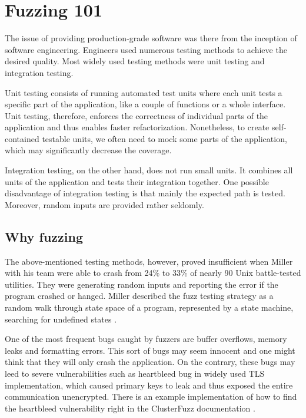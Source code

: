 \chapter{Fuzzing 101}
\label{cha:Introduction to fuzzing}
The issue of providing production-grade software was there from the inception of software engineering. Engineers used numerous testing methods to achieve the desired quality. Most widely used testing methods were unit testing and integration testing.

Unit testing consists of running automated test units where each unit tests a specific part of the application, like a couple of functions or a whole interface. Unit testing, therefore, enforces the correctness of individual parts of the application and thus enables faster refactorization. Nonetheless, to create self-contained testable units, we often need to mock some parts of the application, which may significantly decrease the coverage.

Integration testing, on the other hand, does not run small units. It combines all units of the application and tests their integration together. One possible disadvantage of integration testing is that mainly the expected path is tested. Moreover, random inputs are provided rather seldomly.


\section{Why fuzzing}
The above-mentioned testing methods, however, proved insufficient when Miller with his team were able to crash from 24\% to 33\% of nearly 90 Unix battle-tested utilities. They were generating random inputs and reporting the error if the program crashed or hanged. Miller described the fuzz testing strategy as a random walk through state space of a program, represented by a state machine, searching for undefined states \cite{miller1990empirical}.

One of the most frequent bugs caught by fuzzers are buffer overflows, memory leaks and formatting errors. This sort of bugs may seem innocent and one might think that they will only crash the application. On the contrary, these bugs may leed to severe vulnerabilities such as heartbleed bug \cite{heartbleed2020bug} in widely used TLS implementation, which caused primary keys to leak and thus exposed the entire communication unencrypted. There is an example implementation of how to find the heartbleed vulnerability right in the ClusterFuzz documentation \cite{clusterfuzz2020heartbleed}.


